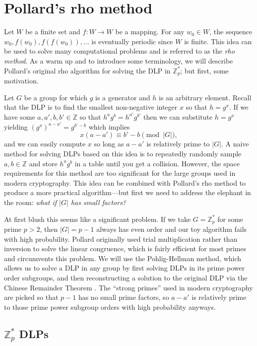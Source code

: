 \documentclass{article}
\newcommand{\ZZ}{\mathbb{Z}}
\begin{document}
\section{Pollard's rho method}

Let $W$ be a finite set and $f: W \to W$ be a mapping. For any $w_0 \in W$, the sequence $w_0, f(w_0), f(f(w_0)), \ldots$ is eventually periodic since $W$ is finite. This idea can be used to solve many computational problems and is referred to as the \textit{rho method}. As a warm up and to introduce some terminology, we will describe Pollard's original rho algorithm for solving the DLP in $\ZZ_p^*$; but first, some motivation.

Let $G$ be a group for which $g$ is a generator and $h$ is an arbitrary element. Recall that the DLP is to find the smallest non-negative integer $x$ so that $h=g^x$. If we have some $a,a',b,b' \in \ZZ$ so that $h^a g^b = h^{a'} g^{b'}$ then we can substitute $h=g^x$ yielding $(g^x)^{a-a'} = g^{b'-b}$ which implies $$x(a-a') \equiv b' - b \pmod{|G|},$$
and we can easily compute $x$ so long as $a-a'$ is relatively prime to $|G|$. A naive method for solving DLPs based on this idea is to repeatedly randomly sample $a,b \in \ZZ$ and store $h^a g^b$ in a table until you get a collision. However, the space requirements for this method are too significant for the large groups used in modern cryptography. This idea can be combined with Pollard's rho method to produce a more practical algorithm---but first we need to address the elephant in the room: \textit{what if $|G|$ has small factors?}

At first blush this seems like a significant problem. If we take $G=\ZZ_p^*$ for some prime $p>2$, then $|G|=p-1$ always has even order and our toy algorithm fails with high probability. Pollard originally used trial multiplication rather than inversion to solve the linear congruence, which is fairly efficient for most primes and circumvents this problem. We will use the Pohlig-Hellman method, which allows us to solve a DLP in any group by first solving DLPs in its prime power order subgroups, and then reconstructing a solution to the original DLP via the Chinese Remainder Theorem \cite{Pohlig78}. The ``strong primes'' used in modern cryptography are picked so that $p-1$ has no small prime factors, so $a-a'$ is relatively prime to those prime power subgroup orders with high probability anyways.

\subsection{$\ZZ_p^*$ DLPs}
\end{document}

